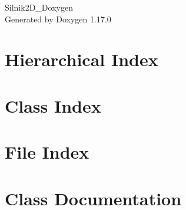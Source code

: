 \documentclass[twoside]{book}
\newcommand{\+}{\discretionary{\mbox{\scriptsize$\hookleftarrow$}}{}{}}
\newcommand{\clearemptydoublepage}{%
    \newpage{\pagestyle{empty}\cleardoublepage}%
  }
\begin{document}
  \raggedbottom
    \hypersetup{pageanchor=false,
                bookmarksnumbered=true,
                pdfencoding=unicode
               }
  \begin{titlepage}
  \vspace*{7cm}
  \begin{center}%
  {\Large Silnik2\+D\+\_\+\+Doxygen}\\
  \vspace*{1cm}
  {\large Generated by Doxygen 1.17.0}\\
  \end{center}
  \end{titlepage}
  \clearemptydoublepage
  \tableofcontents
  \clearemptydoublepage
  \hypersetup{pageanchor=true}
\chapter{Hierarchical Index}

\chapter{Class Index}

\chapter{File Index}

\chapter{Class Documentation}




















\end{document}
